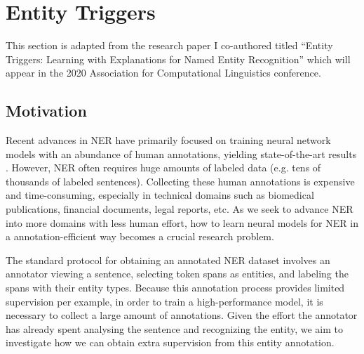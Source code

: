 \chapter{Entity Triggers}
This section is adapted from the research paper I co-authored titled ``Entity Triggers: Learning with Explanations for Named Entity Recognition'' which will appear in the 2020 Association for Computational Linguistics conference.



\section{Motivation}
\label{sec:intro}
Recent advances in NER have primarily focused on training neural network models with an abundance of human annotations, yielding state-of-the-art results \citep{LampleNER}. However, NER often requires huge amounts of labeled data (e.g. tens of thousands of labeled sentences). Collecting these human annotations is expensive and time-consuming, especially in technical domains such as biomedical publications, financial documents, legal reports, etc. As we seek to advance NER into more domains with less human effort, how to learn neural models for NER in a annotation-efficient way becomes a crucial research problem.

The standard protocol for obtaining an annotated NER dataset involves an annotator viewing a sentence, selecting token spans as entities, and labeling the spans with their entity types. Because this annotation process provides limited supervision per example, in order to train a high-performance model, it is necessary to collect a large amount of annotations. Given the effort the annotator has already spent analysing the sentence and recognizing the entity, we aim to investigate how we can obtain extra supervision from this entity annotation.

